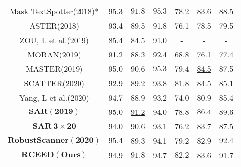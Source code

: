 \documentclass[runningheads]{llncs}
\begin{document}
\begin{table}[]
\begin{tabular}{|c|c|c|c|c|c|c|}
Mask TextSpotter(2018)\cite{liao2019mask}*         & \underline{95.3}           & $\mathbf{91.8}$         & $\mathbf{95.3}$          & 78.2          & 83.6          & 88.5          \\
ASTER(2018)\cite{shi2018aster}                     & 93.4            & 89.5         & 91.8          & 76.1          & 78.5          & 79.5          \\
ZOU, L et al.(2019)\cite{zuo2019natural}        & 85.4            & 84.5         & 91.0          &  -          & -         &  -          \\
MORAN(2019)\cite{luo2019moran}                   & 91.2            & 88.3         & 92.4          &  68.8          & 76.1         &  77.4          \\
MASTER(2019)\cite{lu2019master}                   & 95.0            & 90.6         & $\mathbf{95.3}$         & 79.4          & \underline{84.5}          & 87.5          \\
SCATTER(2020)\cite{litman2020scatter}                & 92.9            & 89.2         & 93.8          & \underline{81.8}          & \underline{84.5}          & 85.1          \\
Yang, L et al.(2020)\cite{yang2020holistic}            & 94.7            & 88.9         & 93.2          & 74.0          & 80.9          & 85.4          \\ \hline
$\mathbf{SAR(2019)}$\cite{li2019show}      & 95.0            & \underline{91.2}         & 94.0          & 78.8          & $\mathbf{86.4}$          & 89.6          \\
$\mathbf{SAR \ 3\times20}$    &94.0      &90.6      &93.1      &76.2     &83.7      &87.5     \\
$\mathbf{RobustScanner(2020)}$\cite{yue2020robustscanner}         & $\mathbf{95.4}$            & 89.3         & 94.1          & 79.2          & 82.9          & $\mathbf{92.4}$          \\ \hline
$\mathbf{RCEED(Ours)}$                       & 94.9                & $\mathbf{91.8}$             & \underline{94.7}              &  $\mathbf{82.2}$             &  83.6             &  \underline{91.7}             \\ \hline
\end{tabular}
\end{table}
\vspace{-0.5cm}
\end{document}
